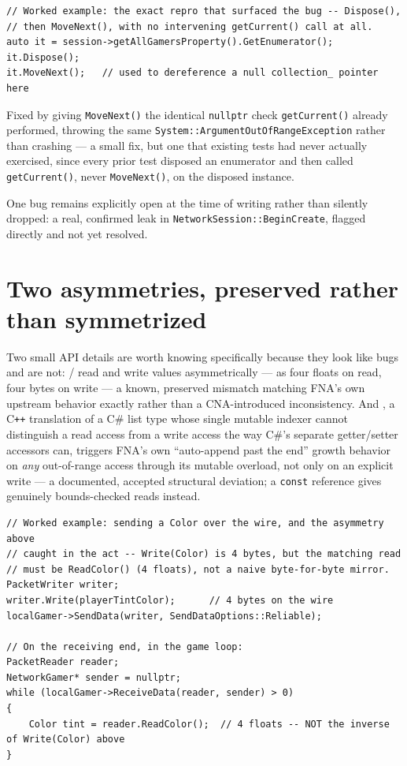\begin{lstlisting}
// Worked example: the exact repro that surfaced the bug -- Dispose(),
// then MoveNext(), with no intervening getCurrent() call at all.
auto it = session->getAllGamersProperty().GetEnumerator();
it.Dispose();
it.MoveNext();   // used to dereference a null collection_ pointer here
\end{lstlisting}

Fixed by giving \texttt{MoveNext()} the identical \texttt{nullptr} check
\texttt{getCurrent()} already performed, throwing the same
\texttt{System::ArgumentOutOfRangeException} rather than crashing --- a small fix, but one that
existing tests had never actually exercised, since every prior test disposed an enumerator and
then called \texttt{getCurrent()}, never \texttt{MoveNext()}, on the disposed instance.

One bug remains explicitly open at the time of writing rather than silently dropped: a real,
confirmed leak in \texttt{NetworkSession::BeginCreate}, flagged directly and not yet
resolved.

\section{Two asymmetries, preserved rather than symmetrized}

Two small API details are worth knowing specifically because they look like bugs and are
not:  /  read and write  values
asymmetrically --- as four floats on read, four bytes on write --- a known, preserved mismatch
matching FNA's own upstream behavior exactly rather than a CNA-introduced inconsistency. And
, a C\texttt{++} translation of a C\# list type whose
single mutable indexer cannot distinguish a read access from a write access the way C\#'s
separate getter/setter accessors can, triggers FNA's own ``auto-append past the end'' growth
behavior on \emph{any} out-of-range access through its mutable overload, not only on an
explicit write --- a documented, accepted structural deviation; a \texttt{const} reference
gives genuinely bounds-checked reads instead.

\begin{lstlisting}
// Worked example: sending a Color over the wire, and the asymmetry above
// caught in the act -- Write(Color) is 4 bytes, but the matching read
// must be ReadColor() (4 floats), not a naive byte-for-byte mirror.
PacketWriter writer;
writer.Write(playerTintColor);      // 4 bytes on the wire
localGamer->SendData(writer, SendDataOptions::Reliable);

// On the receiving end, in the game loop:
PacketReader reader;
NetworkGamer* sender = nullptr;
while (localGamer->ReceiveData(reader, sender) > 0)
{
    Color tint = reader.ReadColor();  // 4 floats -- NOT the inverse of Write(Color) above
}
\end{lstlisting}

